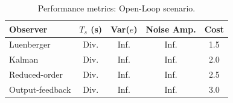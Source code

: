 \begin{table}[htbp]
\centering
\begin{tabularx}{\textwidth}{l CCCC}
\toprule
Observer & $T_s$ (s) & Var($e$) & Noise Amp. & Cost \\
\midrule
Luenberger & Div. & Inf. & Inf. & 1.5 \\
Kalman & Div. & Inf. & Inf. & 2.0 \\
Reduced-order & Div. & Inf. & Inf. & 2.5 \\
Output-feedback & Div. & Inf. & Inf. & 3.0 \\
\bottomrule
\end{tabularx}
\caption{Performance metrics: Open-Loop scenario.}
\label{tab:metrics_ol}
\end{table}
